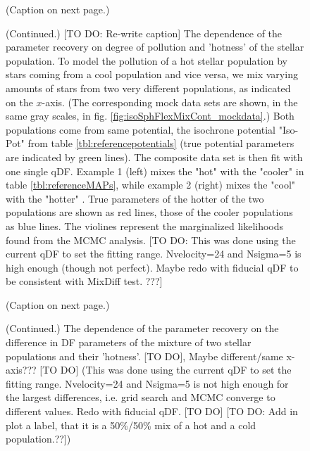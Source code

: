 
\begin{figure}
\caption{(Caption on next page.)}
\label{fig:isoSphFlexMixCont}
\end{figure}

\addtocounter{figure}{-1}
\begin{figure} [t!]
  \caption{(Continued.)  [TO DO: Re-write caption] The dependence of the parameter recovery on degree of pollution and 'hotness' of the stellar population. To model the pollution of a hot stellar population by stars coming from a cool population and vice versa, we mix varying amounts of stars from two very different populations, as indicated on the $x$-axis. (The corresponding mock data sets are shown, in the same gray scales, in fig. \ref{fig:isoSphFlexMixCont_mockdata}.)  Both populations come from same potential, the isochrone potential "Iso-Pot" from table \ref{tbl:referencepotentials}  (true potential parameters are indicated by green lines). The composite data set is then fit with one single qDF. Example 1 (left) mixes the "hot" \MAP with the "cooler" \MAP in table \ref{tbl:referenceMAPs}, while example 2 (right) mixes the "cool" \MAP with the "hotter" \MAP. True parameters of the hotter of the two populations are shown as red lines, those of the cooler populations as blue lines. The violines represent the marginalized likelihoods found from the MCMC analysis. [TO DO: This was done using the current qDF to set the fitting range. Nvelocity=24 and Nsigma=5 is high enough (though not perfect). Maybe redo with fiducial qDF to be consistent with MixDiff test. ???]}
\end{figure}


\begin{figure}
\caption{(Caption on next page.)}
\label{fig:isoSphFlexMixDiff}
\end{figure}


\addtocounter{figure}{-1}
\begin{figure} [t!]
  \caption{(Continued.) The dependence of the parameter recovery on the difference in DF parameters of the mixture of two stellar populations and their 'hotness'.  [TO DO], Maybe different/same x-axis??? [TO DO] (This was done using the current qDF to set the fitting range. Nvelocity=24 and Nsigma=5 is not high enough for the largest differences, i.e. grid search and MCMC converge to different values. Redo with fiducial qDF. [TO DO] [TO DO: Add in plot a label, that it is a 50\%/50\% mix of a hot and a cold population.??])} 
\end{figure}

